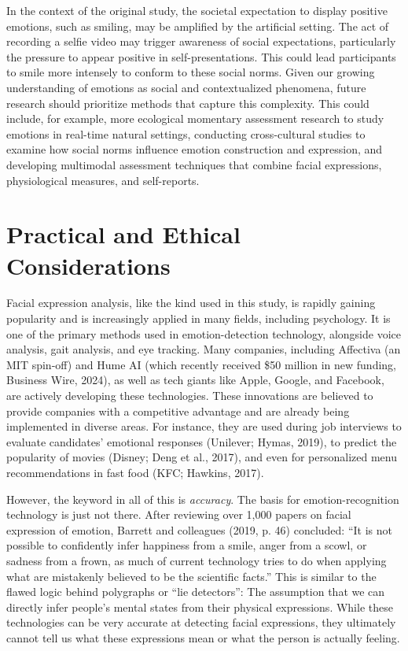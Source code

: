 \documentclass[authordate, reflection]{jote-new-article}
\begin{document}
	In the context of the original study, the societal expectation to display positive emotions, such as smiling, may be amplified by the artificial setting. The act of recording a selfie video may trigger awareness of social expectations, particularly the pressure to appear positive in self-presentations. This could lead participants to smile more intensely to conform to these social norms. Given our growing understanding of emotions as social and contextualized phenomena, future research should prioritize methods that capture this complexity. This could include, for example, more ecological momentary assessment research to study emotions in real-time natural settings, conducting cross-cultural studies to examine how social norms influence emotion construction and expression, and developing multimodal assessment techniques that combine facial expressions, physiological measures, and self-reports.







	\section{Practical and Ethical Considerations}



	Facial expression analysis, like the kind used in this study, is rapidly gaining popularity and is increasingly applied in many fields, including psychology. It is one of the primary methods used in emotion-detection technology, alongside voice analysis, gait analysis, and eye tracking. Many companies, including Affectiva (an MIT spin-off) and Hume AI (which recently received \$50 million in new funding, Business Wire, 2024), as well as tech giants like Apple, Google, and Facebook, are actively developing these technologies. These innovations are believed to provide companies with a competitive advantage and are already being implemented in diverse areas. For instance, they are used during job interviews to evaluate candidates' emotional responses (Unilever; Hymas, 2019), to predict the popularity of movies (Disney; Deng et al., 2017), and even for personalized menu recommendations in fast food (KFC; Hawkins, 2017).



	However, the keyword in all of this is \emph{accuracy}. The basis for emotion-recognition technology is just not there. After reviewing over 1,000 papers on facial expression of emotion, Barrett and colleagues (2019, p. 46) concluded: “It is not possible to confidently infer happiness from a smile, anger from a scowl, or sadness from a frown, as much of current technology tries to do when applying what are mistakenly believed to be the scientific facts.” This is similar to the flawed logic behind polygraphs or “lie detectors”: The assumption that we can directly infer people's mental states from their physical expressions. While these technologies can be very accurate at detecting facial expressions, they ultimately cannot tell us what these expressions mean or what the person is actually feeling.
\end{document}
